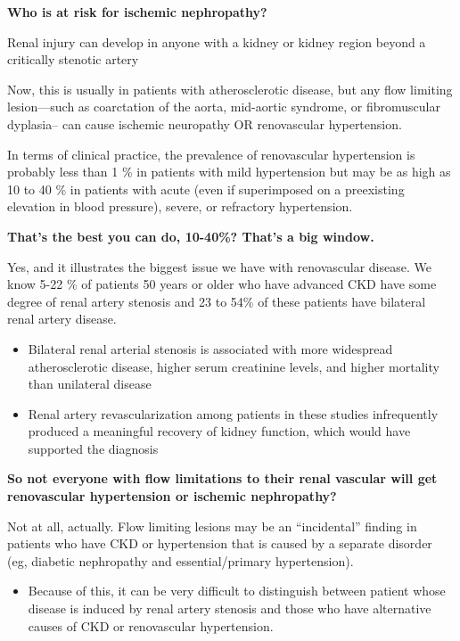 \documentclass[
]{book}
\providecommand{\tightlist}{%
  \setlength{\itemsep}{0pt}\setlength{\parskip}{0pt}}
\begin{document}
\textbf{Who is at risk for ischemic nephropathy?}

Renal injury can develop in anyone with a kidney or kidney region beyond
a critically stenotic artery

Now, this is usually in patients with atherosclerotic disease, but any
flow limiting lesion---such as coarctation of the aorta, mid-aortic
syndrome, or fibromuscular dyplasia-- can cause ischemic neuropathy OR
renovascular hypertension.

In terms of clinical practice, the prevalence of renovascular
hypertension is probably less than 1 \% in patients with mild
hypertension but may be as high as 10 to 40 \% in patients with acute
(even if superimposed on a preexisting elevation in blood pressure),
severe, or refractory hypertension.

\textbf{That's the best you can do, 10-40\%? That's a big window.}

Yes, and it illustrates the biggest issue we have with renovascular
disease. We know 5-22 \% of patients 50 years or older who have advanced
CKD have some degree of renal artery stenosis and 23 to 54\% of these
patients have bilateral renal artery disease.

\begin{itemize}
\item
  Bilateral renal arterial stenosis is associated with more widespread
  atherosclerotic disease, higher serum creatinine levels, and higher
  mortality than unilateral disease
\item
  Renal artery revascularization among patients in these studies
  infrequently produced a meaningful recovery of kidney function,
  which would have supported the diagnosis
\end{itemize}

\textbf{So not everyone with flow limitations to their renal vascular will get
renovascular hypertension or ischemic nephropathy?}

Not at all, actually. Flow limiting lesions may be an ``incidental''
finding in patients who have CKD or hypertension that is caused by a
separate disorder (eg, diabetic nephropathy and essential/primary
hypertension).

\begin{itemize}
\tightlist
\item
  Because of this, it can be very difficult to distinguish between
  patient whose disease is induced by renal artery stenosis and those
  who have alternative causes of CKD or renovascular hypertension.
\end{itemize}
\end{document}
